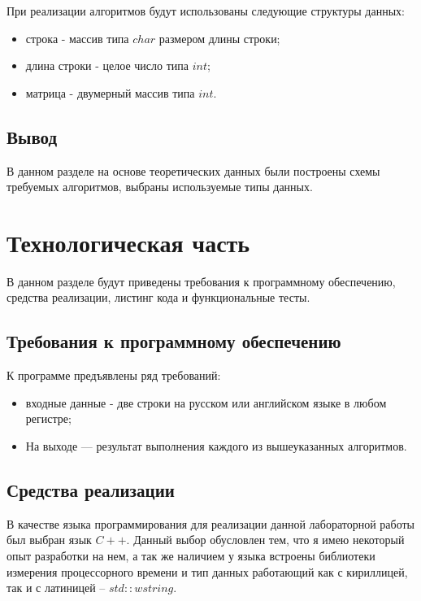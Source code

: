 \documentclass[a4paper,14pt, unknownkeysallowed]{bmstu}
\begin{document}
При реализации алгоритмов будут использованы следующие структуры данных:

\begin{itemize}
	\item строка - массив типа $char$ размером длины строки;
	\item длина строки - целое число типа $int$;
	\item матрица - двумерный массив типа $int$.
\end{itemize}

\section{Вывод}

В данном разделе на основе теоретических данных были построены схемы
требуемых алгоритмов, выбраны используемые типы данных.

\chapter{Технологическая часть}

В данном разделе будут приведены требования к программному обеспечению, средства реализации, листинг кода и функциональные тесты.

\section{Требования к программному обеспечению}

К программе предъявлены ряд требований:

\begin{itemize}
	\item входные данные - две строки на русском или английском языке в любом
регистре;
    \item На выходе — результат выполнения каждого из вышеуказанных алгоритмов.
\end{itemize}

\section{Средства реализации}

В качестве языка программирования для реализации данной лабораторной работы был выбран язык $C++$. Данный выбор обусловлен тем,
что я имею некоторый опыт разработки на нем, а так же наличием у языка
встроены библиотеки измерения процессорного времени и тип данных работающий как с кириллицей, так и с латиницей -- $std::wstring$.
\end{document}
